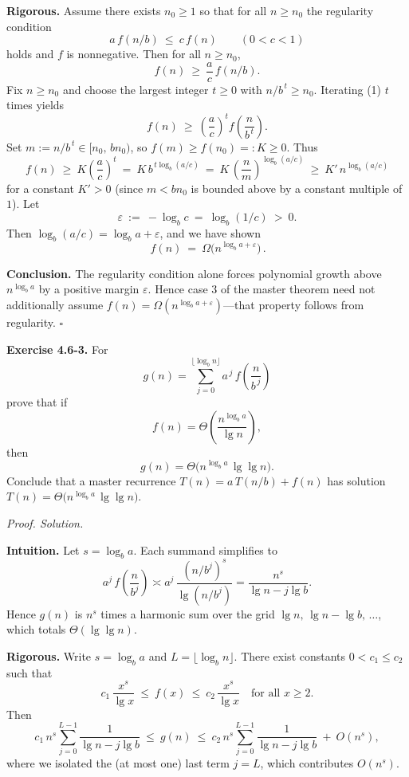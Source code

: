\documentclass[12pt]{article}
\theoremstyle{definition}
\begin{document}
\noindent\textbf{Rigorous.}
Assume there exists $n_0\ge1$ so that for all $n\ge n_0$ the regularity condition
\[
a\,f(n/b)\ \le\ c\,f(n)\qquad(0<c<1)
\tag{$\ast$}
\]
holds and $f$ is nonnegative. Then for all $n\ge n_0$,
\[
f(n)\ \ge\ \frac{a}{c}\,f(n/b). \tag{1}
\]
Fix $n\ge n_0$ and choose the largest integer $t\ge 0$ with $n/b^{\,t}\ge n_0$.
Iterating (1) $t$ times yields
\[
f(n)\ \ge\ \left(\frac{a}{c}\right)^{\!t} f\!\left(\frac{n}{b^{\,t}}\right).
\]
Set $m:=n/b^{\,t}\in[n_0,\,b n_0)$, so $f(m)\ge f(n_0)=:K\ge0$.
Thus
\[
f(n)\ \ge\ K\left(\frac{a}{c}\right)^{\!t}
\ =\ K\, b^{\,t\log_b(a/c)}
\ =\ K\, \left(\frac{n}{m}\right)^{\log_b(a/c)}
\ \ge\ K' \, n^{\log_b(a/c)}
\]
for a constant $K'>0$ (since $m<b n_0$ is bounded above by a constant multiple of $1$).
Let
\[
\varepsilon\ :=\ -\log_b c\ =\ \log_b(1/c)\ >\ 0.
\]
Then $\log_b(a/c)=\log_b a + \varepsilon$, and we have shown
\[
\boxed{\,f(n)\ =\ \Omega\!\big(n^{\log_b a+\varepsilon}\big)\,}.
\]

\textbf{Conclusion.}
The regularity condition alone forces polynomial growth above $n^{\log_b a}$ by a positive
margin $\varepsilon$. Hence case 3 of the master theorem need not additionally assume
$f(n)=\Omega(n^{\log_b a+\varepsilon})$—that property follows from regularity.
\hfill$\square$

\newpage

\noindent\textbf{Exercise 4.6-3.}
For
\[
g(n)=\sum_{j=0}^{\lfloor \log_b n \rfloor} a^{\,j}\,f\!\left(\frac{n}{b^{\,j}}\right)\tag{4.19}
\]
prove that if
\[
f(n)=\Theta\!\left(\frac{n^{\log_b a}}{\lg n}\right),
\]
then
\[
g(n)=\Theta\!\big(n^{\log_b a}\,\lg\lg n\big).
\]
Conclude that a master recurrence $T(n)=a\,T(n/b)+f(n)$ has solution
$T(n)=\Theta\!\big(n^{\log_b a}\,\lg\lg n\big)$.

\medskip
\noindent\textit{Proof. Solution.}

\noindent\textbf{Intuition.}
Let $s=\log_b a$. Each summand simplifies to
\[
a^{j}\,f\!\left(\frac{n}{b^{j}}\right)\asymp
a^{j}\,\frac{(n/b^{j})^{s}}{\lg(n/b^{j})}
=\frac{n^{s}}{\lg n - j\lg b}.
\]
Hence $g(n)$ is $n^{s}$ times a harmonic sum over the grid
$\lg n,\,\lg n-\lg b,\,\ldots$, which totals $\Theta(\lg\lg n)$.

\noindent\textbf{Rigorous.}
Write $s=\log_b a$ and $L=\lfloor \log_b n \rfloor$.
There exist constants $0<c_1\le c_2$ such that
\[
c_1\,\frac{x^{s}}{\lg x}\ \le\ f(x)\ \le\ c_2\,\frac{x^{s}}{\lg x}
\quad\text{for all }x\ge 2.
\]
Then
\[
c_1\,n^{s}\sum_{j=0}^{L-1}\frac{1}{\lg n - j\lg b}
\ \le\ g(n)\ \le\
c_2\,n^{s}\sum_{j=0}^{L-1}\frac{1}{\lg n - j\lg b}
\ +\ O(n^{s}),
\]
where we isolated the (at most one) last term $j=L$, which contributes $O(n^{s})$.
\end{document}
